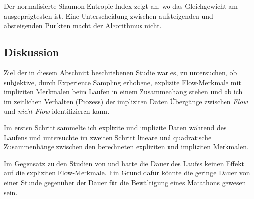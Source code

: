 Der normalisierte Shannon Entropie Index zeigt an, wo das Gleichgewicht am ausgeprägtesten ist. Eine Unterscheidung zwischen aufsteigenden und absteigenden Punkten macht der Algorithmus nicht. 

\subsection{Diskussion} 

\label{sub:diskussion_5_1}

Ziel der in diesem Abschnitt beschriebenen Studie war es, zu untersuchen, ob subjektive, durch Experience Sampling erhobene, explizite Flow-Merkmale mit impliziten Merkmalen beim Laufen in einem Zusammenhang stehen und ob ich im zeitlichen Verhalten (Prozess) der impliziten Daten Übergänge zwischen \emph{Flow} und \emph{nicht Flow} identifizieren kann. 

Im ersten Schritt sammelte ich explizite und implizite Daten während des Laufens und untersuchte im zweiten Schritt lineare und quadratische Zusammenhänge zwischen den berechneten expliziten und impliziten Merkmalen. 

Im Gegensatz zu den Studien von \citet{Stoll2005} und \citet{Schuler2009} hatte die Dauer des Laufes keinen Effekt auf die expliziten Flow-Merkmale. Ein Grund dafür könnte die geringe Dauer von einer Stunde gegenüber der Dauer für die Bewältigung eines Marathons gewesen sein.

